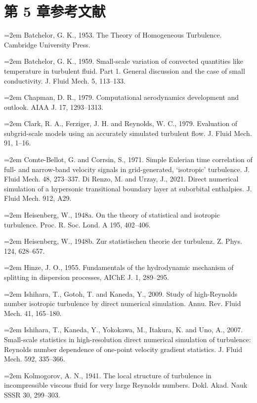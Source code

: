 \documentclass[12pt,a4paper,openany,fontset=none]{ctexbook}
\begin{document}
\section*{第 5 章参考文献}
\par\hangindent=2em Batchelor, G. K., 1953. The Theory of Homogeneous Turbulence. Cambridge University Press.
\par\hangindent=2em Batchelor, G. K., 1959. Small-scale variation of convected quantities like temperature in turbulent fluid. Part 1. General discussion and the case of small conductivity. J. Fluid Mech. 5, 113–133.
\par\hangindent=2em Chapman, D. R., 1979. Computational aerodynamics development and outlook. AIAA J. 17, 1293–1313.
\par\hangindent=2em Clark, R. A., Ferziger, J. H. and Reynolds, W. C., 1979. Evaluation of subgrid-scale models using an accurately simulated turbulent flow. J. Fluid Mech. 91, 1–16.
\par\hangindent=2em Comte-Bellot, G. and Corrsin, S., 1971. Simple Eulerian time correlation of full- and narrow-band velocity signals in grid-generated, ‘isotropic’ turbulence. J. Fluid Mech. 48, 273–337. Di Renzo, M. and Urzay, J., 2021. Direct numerical simulation of a hypersonic transitional boundary layer at suborbital enthalpies. J. Fluid Mech. 912, A29.
\par\hangindent=2em Heisenberg, W., 1948a. On the theory of statistical and isotropic turbulence. Proc. R. Soc. Lond. A 195, 402–406.
\par\hangindent=2em Heisenberg, W., 1948b. Zur statistischen theorie der turbulenz. Z. Phys. 124, 628–657.
\par\hangindent=2em Hinze, J. O., 1955. Fundamentals of the hydrodynamic mechanism of splitting in dispersion processes, AIChE J. 1, 289–295.
\par\hangindent=2em Ishihara, T., Gotoh, T. and Kaneda, Y., 2009. Study of high-Reynolds number isotropic turbulence by direct numerical simulation. Annu. Rev. Fluid Mech. 41, 165–180.
\par\hangindent=2em Ishihara, T., Kaneda, Y., Yokokawa, M., Itakura, K. and Uno, A., 2007. Small-scale statistics in high-resolution direct numerical simulation of turbulence: Reynolds number dependence of one-point velocity gradient statistics. J. Fluid Mech. 592, 335–366.
\par\hangindent=2em Kolmogorov, A. N., 1941. The local structure of turbulence in incompressible viscous fluid for very large Reynolds numbers. Dokl. Akad. Nauk SSSR 30, 299–303.
\end{document}
